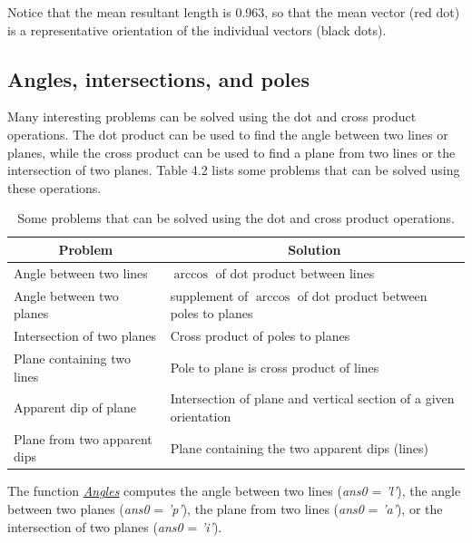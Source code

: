 \documentclass[a4paper , 12pt]{book}
\begin{document}
Notice that the mean resultant length is 0.963, so that the mean vector (red dot) is a representative orientation of the individual vectors (black dots).

\subsection{Angles, intersections, and poles}

Many interesting problems can be solved using the dot and cross product operations. The dot product can be used to find the angle between two lines or planes, while the cross product can be used to find a plane from two lines or the intersection of two planes. Table 4.2 lists some problems that can be solved using these operations.

\begin{table}[h!]
\small
\centering
\begin{tabular}{ | p{6cm} | p{6cm} | } 
 \hline
 \multicolumn{1}{|c|}{Problem} & \multicolumn{1}{|c|}{Solution}  \\
 \hline
 Angle between two lines & $\arccos$ of dot product between lines \\
 \hline
 Angle between two planes & supplement of $\arccos$ of dot product between poles to planes \\
 \hline
 Intersection of two planes & Cross product of poles to planes \\
 \hline
 Plane containing two lines & Pole to plane is cross product of lines \\
 \hline
 Apparent dip of plane & Intersection of plane and vertical section of a given orientation \\
 \hline
 Plane from two apparent dips & Plane containing the two apparent dips (lines) \\
 \hline
\end{tabular}
\caption{Some problems that can be solved using the dot and cross product operations.}
\label{table4.2}
\end{table}

The function \href{https://github.com/nfcd/compGeo/blob/master/source/functions/Angles.py}{\textit{Angles}} computes the angle between two lines (\textit{ans0} = \textit{'l'}), the angle between two planes (\textit{ans0} = \textit{'p'}), the plane from two lines (\textit{ans0} = \textit{'a'}), or the intersection of two planes (\textit{ans0} = \textit{'i'}).
\end{document}
